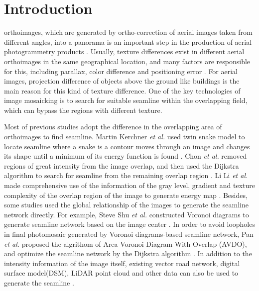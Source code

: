 \documentclass[journal]{IEEEtran}
\begin{document}
\IEEEpeerreviewmaketitle

\section{Introduction}
 orthoimages, which are generated by ortho-correction of aerial images taken from different angles, into a panorama is an important step in the production of aerial photogrammetry products \cite{Chon2010,Pan2014a,Mills2013}. Usually, texture differences exist in different aerial orthoimages in the same geographical location, and many factors are responsible for this, including parallax, color difference and positioning error \cite{Li2015,Yu2012,Zhang2014}. For aerial images, projection difference of objects above the ground like buildings is the main reason for this kind of texture difference. One of the key technologies of image mosaicking is to search for suitable seamline within the overlapping field, which can bypass the regions with different texture.

Most of previous studies adopt the difference in the overlapping area of orthoimages to find seamline. Martin Kerchner \textit{et al.} used twin snake model to locate seamline where a snake is a contour moves through an image and changes its shape until a minimum of its energy function is found \cite{Kerschner2001}. Chon \textit{et al.} removed regions of great intensity from the image overlap, and then used the Dijkstra algorithm to search for seamline from the remaining overlap region \cite{Chon2010}. Li Li \textit{et al.} made comprehensive use of the information of the gray level, gradient and texture complexity of the overlap region of the image to generate energy map \cite{Li2016}. Besides, some studies used the global relationship of the images to generate the seamline network directly. For example, Steve Shu \textit{et al.} constructed Voronoi diagrams to generate seamline network based on the image center \cite{Hsu2002}. In order to avoid loopholes in final photomosaic generated by Voronoi diagrams-based seamline network, Pan \textit{et al.} proposed the algrithom of Area Voronoi Diagram With Overlap (AVDO), and optimize the seamline network by the Dijkstra algorithm \cite{Pan2009,Pan2014a}. In addition to the intensity information of the image itself, existing vector road network, digital surface model(DSM), LiDAR point cloud and other data can also be used to generate the seamline \cite{Chen2014,Wan2013,Hong2011Intelligent,Pang2016SGM}.
\end{document}
